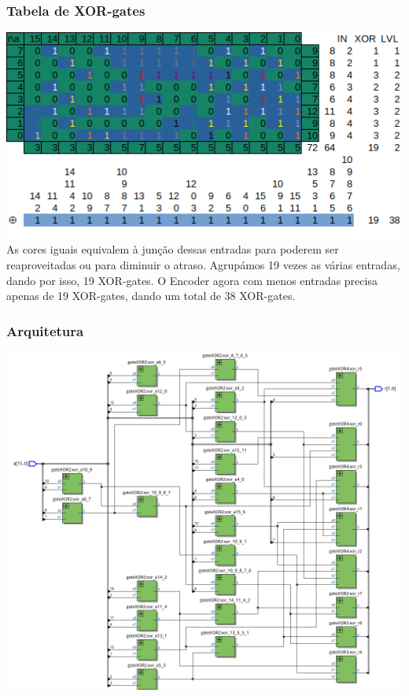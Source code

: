 \documentclass{beamer}
\begin{document}
\begin{frame}
\frametitle{Tabela de XOR-gates}
\includegraphics[scale=0.55]{tabela.png}\\
    As cores iguais equivalem à junção dessas entradas para poderem ser reaproveitadas ou para diminuir o atraso. Agrupámos 19 vezes as várias entradas, dando por isso, 19 XOR-gates.
    O Encoder agora com menos entradas precisa apenas de 19 XOR-gates, dando um total de 38 XOR-gates.
\end{frame}

\begin{frame}
\frametitle{Arquitetura}
\includegraphics[scale=0.25]{arq.png}
\end{frame}
\end{document}
